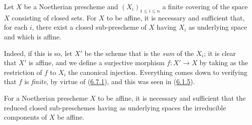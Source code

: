 \begin{corollary}[6.7.2]
\label{II.6.7.2}
Let $X$ be a Noetherian prescheme and $(X_i)_{1\leq i\leq n}$ a finite
covering of the space $X$ consisting of closed sets. For $X$ to be affine, it
is necessary and sufficient that, for each $i$, there exist a closed
sub-prescheme of $X$ having $X_i$ as underlying space and which is affine.
\end{corollary}

Indeed, if this is so, let $X'$ be the scheme that is the \emph{sum} of the
$X_i$; it is clear that $X'$ is affine, and we define a surjective morphism
$f:X'\to X$ by taking as the restriction of $f$ to $X_i$ the canonical
injection. Everything comes down to verifying that $f$ is \emph{finite}, by
virtue of (\hyperref[II.6.7.1]{6.7.1}), and this was seen in
(\hyperref[II.6.1.5]{6.1.5}).

\begin{corollary}[6.7.3]
\label{II.6.7.3}
For a Noetherian prescheme $X$ to be affine, it is necessary and sufficient
that the reduced closed sub-preschemes having as underlying spaces the
irreducible components of $X$ be affine.
\end{corollary}

